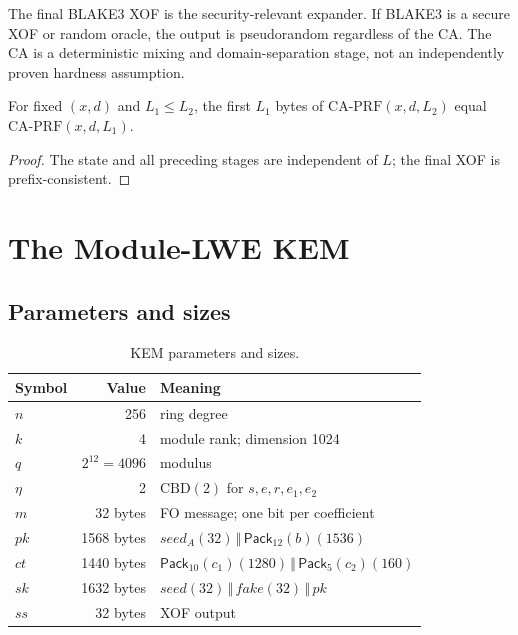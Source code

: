 \documentclass[runningheads]{llncs}
\newcommand{\concat}{\,\Vert\,}
\newcommand{\Pack}{\mathsf{Pack}}
\newcommand{\CBD}{\mathrm{CBD}}
\begin{document}
\begin{remark}
The final BLAKE3 XOF is the security-relevant expander.  If BLAKE3 is a
secure XOF or random oracle, the output is pseudorandom regardless of
the CA.  The CA is a deterministic mixing and domain-separation stage,
not an independently proven hardness assumption.
\end{remark}

\begin{lemma}
For fixed $(x,d)$ and $L_1\le L_2$, the first $L_1$ bytes of
$\mathrm{CA\text{-}PRF}(x,d,L_2)$ equal
$\mathrm{CA\text{-}PRF}(x,d,L_1)$.
\end{lemma}

\begin{proof}
The state and all preceding stages are independent of $L$; the final
XOF is prefix-consistent.
\end{proof}

\section{The Module-LWE KEM}
\label{sec:kem}

\subsection{Parameters and sizes}

\begin{table}[t]
\centering
\small
\begin{tabular}{@{}lrl@{}}
\toprule
Symbol & Value & Meaning \\
\midrule
$n$ & 256 & ring degree \\
$k$ & 4 & module rank; dimension 1024 \\
$q$ & $2^{12}=4096$ & modulus \\
$\eta$ & 2 & $\CBD(2)$ for $s,e,r,e_1,e_2$ \\
$m$ & 32 bytes & FO message; one bit per coefficient \\
$pk$ & 1568 bytes & $\mathit{seed}_A(32)\concat\Pack_{12}(b)(1536)$ \\
$ct$ & 1440 bytes & $\Pack_{10}(c_1)(1280)\concat\Pack_5(c_2)(160)$ \\
$sk$ & 1632 bytes & $\mathit{seed}(32)\concat\mathit{fake}(32)\concat pk$ \\
$ss$ & 32 bytes & XOF output \\
\bottomrule
\end{tabular}
\caption{KEM parameters and sizes.}
\label{tab:kemparams}
\end{table}
\end{document}
